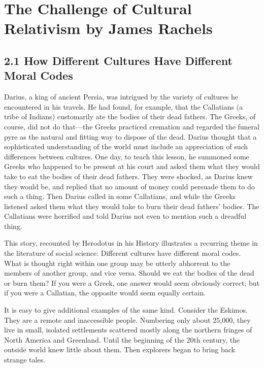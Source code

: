 \chapter{The Challenge of Cultural Relativism by James Rachels}\autocite{Rachels1}


\section{2.1 How Different Cultures Have Different Moral Codes} 
Darius, a king of ancient Persia, was intrigued by the variety of cultures 
he  encountered  in  his  travels.  He  had  found,  for  example,  that  the 
Callatians  (a  tribe  of  Indians)  customarily  ate  the  bodies  of  their  dead 
fathers.  The  Greeks,  of  course,  did  not  do  that—the Greeks  practiced 
cremation and regarded the funeral pyre as the natural and fitting way to 
dispose  of  the  dead.  Darius  thought  that  a  sophisticated  understanding 
of  the  world  must  include  an  appreciation  of  such  differences  between 
cultures. One day, to teach this lesson, he summoned some Greeks who 
happened  to  be  present  at  his  court  and  asked  them  what  they  would 
take  to  eat  the  bodies  of  their  dead  fathers.  They  were  shocked,  as 
Darius knew they would be, and replied that no amount of money could 
persuade them to do such a thing. Then Darius called in some 
Callatians,  and  while  the  Greeks  listened  asked  them  what  they  would 
take to burn their dead fathers' bodies. The Callatians were horrified and 
told Darius not even to mention such a dreadful thing.

This  story,  recounted  by  Herodotus  in  his  History  illustrates  a  recurring 
theme in the literature of social science: Different cultures have different 
moral  codes.  What  is  thought  right  within  one  group  may  be  utterly 
abhorrent  to the members  of another  group, and  vice versa. Should  we 
eat  the  bodies  of  the  dead  or  burn  them?  If  you  were  a  Greek,  one 
answer  would  seem  obviously  correct;  but  if  you  were  a  Callatian,  the 
opposite would seem equally certain. 

It  is  easy  to  give  additional  examples  of  the  same  kind.  Consider  the 
Eskimos.  They  are  a  remote  and  inaccessible  people.  Numbering  only 
about  25,000,  they  live  in  small,  isolated  settlements  scattered  mostly 
along  the  northern  fringes  of  North  America  and  Greenland.  Until  the 
beginning  of  the  20th  century,  the  outside  world knew  little  about  them. 
Then explorers began to bring back strange tales. 

